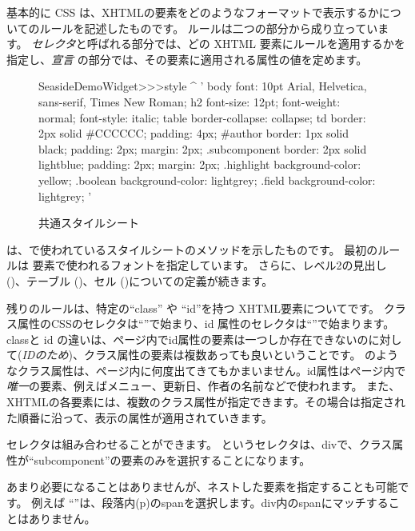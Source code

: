 \documentclass[a4paper,10pt,twoside]{book}
\begin{document}
基本的に CSS は、XHTMLの要素をどのようなフォーマットで表示するかについてのルールを記述したものです。
ルールは二つの部分から成り立っています。
\emph{セレクタ}と呼ばれる部分では、どの XHTML 要素にルールを適用するかを指定し、\emph{宣言} の部分では、その要素に適用される属性の値を定めます。

\begin{figure}[tb]
\begin{code}{}
SeasideDemoWidget>>>style
	^ '
body {
	font: 10pt Arial, Helvetica, sans-serif, Times New Roman;
}
h2 {
	font-size: 12pt;
	font-weight: normal;
	font-style: italic;
}
table { border-collapse: collapse; }
td {
	border: 2px solid #CCCCCC;
	padding: 4px;
}
#author {
	border: 1px solid black;
	padding: 2px;
	margin: 2px;
}
.subcomponent {
	border: 2px solid lightblue;
	padding: 2px;
	margin: 2px;
}
.highlight { background-color: yellow; }
.boolean { background-color: lightgrey; }
.field { background-color: lightgrey; }
'
\end{code}
\caption{ 共通スタイルシート
}
\end{figure}
 は、で使われているスタイルシートのメソッドを示したものです。
最初のルールは 要素で使われるフォントを指定しています。
さらに、レベル2の見出し ()、テーブル ()、セル ()についての定義が続きます。

残りのルールは、特定の``class'' や ``id''を持つ XHTML要素についてです。
クラス属性のCSSのセレクタは``''で始まり、id 属性のセレクタは``\ct{#}''で始まります。
classと id の違いは、ページ内でid属性の要素は一つしか存在できないのに対して(\emph{IDのため})、クラス属性の要素は複数あっても良いということです。
のようなクラス属性は、ページ内に何度出てきてもかまいません。id属性はページ内で \emph{唯一}の要素、例えばメニュー、更新日、作者の名前などで使われます。
また、XHTMLの各要素には、複数のクラス属性が指定できます。その場合は指定された順番に沿って、表示の属性が適用されていきます。


セレクタは組み合わせることができます。  というセレクタは、divで、クラス属性が``subcomponent''の要素のみを選択することになります。

あまり必要になることはありませんが、ネストした要素を指定することも可能です。
例えば ``''は、段落内(p)のspanを選択します。div内のspanにマッチすることはありません。
\end{document}
